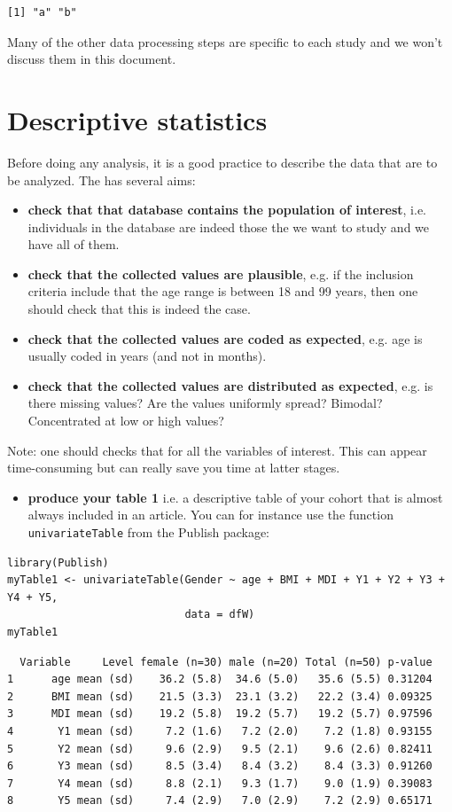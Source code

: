 \documentclass{article}
\begin{document}
\begin{verbatim}
[1] "a" "b"
\end{verbatim}

Many of the other data processing steps are specific to each study and
we won't discuss them in this document. 

\clearpage

\section{Descriptive statistics}
\label{sec:descriptive}
Before doing any analysis, it is a good practice to describe the data
that are to be analyzed. The has several aims:
\begin{itemize}
\item \textbf{check that that database contains the population of interest},
i.e. individuals in the database are indeed those the we want to
study and we have all of them.
\item \textbf{check that the collected values are plausible}, e.g. if the inclusion
criteria include that the age range is between 18 and 99 years, then
one should check that this is indeed the case.
\item \textbf{check that the collected values are coded as expected}, e.g. age is
usually coded in years (and not in months).
\item \textbf{check that the collected values are distributed as expected},
e.g. is there missing values? Are the values uniformly spread?
Bimodal? Concentrated at low or high values?
\end{itemize}

Note: one should checks that for all the variables of interest. This
can appear time-consuming but can really save you time at latter
stages. 

\begin{itemize}
\item \textbf{produce your table 1} i.e. a descriptive table of your cohort that
is almost always included in an article. You can for instance use
the function \texttt{univariateTable} from the Publish package:
\end{itemize}
\lstset{language=r,label= ,caption= ,captionpos=b,numbers=none}
\begin{lstlisting}
library(Publish)
myTable1 <- univariateTable(Gender ~ age + BMI + MDI + Y1 + Y2 + Y3 + Y4 + Y5, 
							data = dfW)
myTable1
\end{lstlisting}

\begin{verbatim}
  Variable     Level female (n=30) male (n=20) Total (n=50) p-value
1      age mean (sd)    36.2 (5.8)  34.6 (5.0)   35.6 (5.5) 0.31204
2      BMI mean (sd)    21.5 (3.3)  23.1 (3.2)   22.2 (3.4) 0.09325
3      MDI mean (sd)    19.2 (5.8)  19.2 (5.7)   19.2 (5.7) 0.97596
4       Y1 mean (sd)     7.2 (1.6)   7.2 (2.0)    7.2 (1.8) 0.93155
5       Y2 mean (sd)     9.6 (2.9)   9.5 (2.1)    9.6 (2.6) 0.82411
6       Y3 mean (sd)     8.5 (3.4)   8.4 (3.2)    8.4 (3.3) 0.91260
7       Y4 mean (sd)     8.8 (2.1)   9.3 (1.7)    9.0 (1.9) 0.39083
8       Y5 mean (sd)     7.4 (2.9)   7.0 (2.9)    7.2 (2.9) 0.65171
\end{verbatim}
\end{document}
